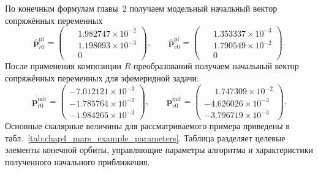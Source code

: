 По конечным формулам главы~2 получаем модельный начальный вектор сопряжённых переменных
\begin{equation}
\widehat{\mathbf p}_{r0}^{\mathrm{pl}}=
\begin{pmatrix}
	\phantom{-}1.982747\times10^{-2}\\
	\phantom{-}1.198093\times10^{-3}\\
	\phantom{-}0
\end{pmatrix},
\qquad
\widehat{\mathbf p}_{v0}^{\mathrm{pl}}=
\begin{pmatrix}
	\phantom{-}1.353337\times10^{-3}\\
	\phantom{-}1.790549\times10^{-2}\\
	\phantom{-}0
\end{pmatrix}.
\end{equation}
После применения композиции \(R\)-преобразований получаем начальный вектор сопряжённых переменных для эфемеридной задачи:
\begin{equation}
\mathbf p_{r0}^{\mathrm{init}}=
\begin{pmatrix}
	-7.012121\times10^{-3}\\
	-1.785764\times10^{-2}\\
	-1.984265\times10^{-3}
\end{pmatrix},
\qquad
\mathbf p_{v0}^{\mathrm{init}}=
\begin{pmatrix}
	\phantom{-}1.747309\times10^{-2}\\
	-4.626026\times10^{-3}\\
	-3.796719\times10^{-3}
\end{pmatrix}.
\end{equation}
Основные скалярные величины для рассматриваемого примера приведены в табл.~\ref{tab:chap4_mars_example_parameters}. Таблица разделяет целевые элементы конечной орбиты, управляющие параметры алгоритма и характеристики полученного начального приближения.

